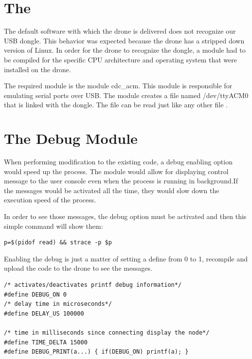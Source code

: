 \section{The }

The default software with which the drone is delivered does not recognize our USB dongle. This behavior was expected because the drone has a stripped down version of Linux. In order for the drone to recognize the dongle, a module had to be compiled for the specific CPU architecture and operating system that were installed on the drone.

The required module is the module cdc\_acm\cite{cdcacm}. This module is responsible for emulating serial ports over USB. The module creates a file named /dev/ttyACM0 that is linked with the dongle. The file can be read just like any other file . 

\section{The Debug Module}
 
When performing modification to the existing code, a debug enabling option would speed up the process. The module would allow for displaying control message to the user console even when the process is running in background.If the messages would be activated all the time, they would slow down the execution speed of the process.

In order to see those messages, the debug option must be activated and then this simple command will show them:

\begin{lstlisting}
p=$(pidof read) && strace -p $p
\end{lstlisting}

Enabling the debug is just a matter of setting  a define from 0 to 1, recompile and upload the code to the drone to see the messages.

\lstset{numbers=none, mathescape=true, nolol=false,caption=Debug and timing defines,label=lst:task}
\begin{lstlisting}
/* activates/deactivates printf debug information*/
#define DEBUG_ON 0
/* delay time in microseconds*/
#define DELAY_US 100000

/* time in milliseconds since connecting display the node*/
#define TIME_DELTA 15000
#define DEBUG_PRINT(a...) { if(DEBUG_ON) printf(a); }
\end{lstlisting}

